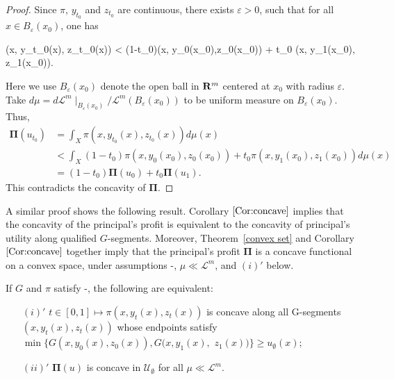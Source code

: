 \begin{proof}
	Since $\pi$, $y_{t_0}$ and $z_{t_0}$ are continuous, there exists $\varepsilon >0$, such that for all $x\in B_{\varepsilon}(x_0)$, one has
	\begin{flalign*}
	\pi(x, y_{t_0}(x), z_{t_0}(x)) < (1-t_0)\pi(x, y_0(x_0),z_0(x_0))  + t_0 \pi(x, y_1(x_0), z_1(x_0)).
	\end{flalign*} 
	Here we use $B_{\varepsilon}(x_0)$ denote the open ball in ${\mathbf R}^m$ centered at $x_0$ with radius $\varepsilon$.
	Take $d\mu = d\mathcal{L}^m
	\mid _{B_{\varepsilon} (x_0)}/{\mathcal{L}^m} 
	(B_{\varepsilon}(x_0))$ to be uniform measure on $B_\varepsilon(x_0)$. 
	Thus, 
	\begin{align*}
	\pmb \Pi (u_{t_0}) &= \int_X \pi(x, y_{t_0}(x), z_{t_0}(x)) d\mu(x)\\
	&<  \int_X    (1-t_0)\pi(x, y_0(x_0),z_0(x_0))  + t_0 \pi(x, y_1(x_0), z_1(x_0))     d\mu(x)\\
	&=(1-t_0)\pmb \Pi(u_0)+ t_0 \pmb \Pi(u_1).
	\end{align*}
	This contradicts the concavity of $\pmb \Pi$.
\end{proof}

A similar proof shows the following result. Corollary $\ref{Cor:concave}$ implies that the concavity of the principal's profit is equivalent to the concavity of principal's utility along qualified $G$-segments. Moreover, Theorem~\ref{convex set} and Corollary $\ref{Cor:concave}$ together imply that the principal's profit $\pmb \Pi$ is a concave functional on a convex space, under assumptions \Gzero-\Gfive, $\mu\ll \mathcal{L}^m$, and $(i)'$ below. 
\medskip

\begin{corollary}\label{Cor:concave}
	If $G$ and $\pi$ satisfy \Gzero-\Gfive,  the following are equivalent:
	\begin{enumerate}[(i)]
	\item[$(i)'$] $t\in[0,1] \longmapsto \pi(x, y_t(x) ,z_t(x))$ is concave  along all G-segments $(x, y_t(x), z_t(x))$ whose 
	endpoints satisfy $\min\{G(x, y_0(x), z_0(x)),G(x,y_1(x),$
	$z_1(x))\} \ge u_{\emptyset}(x)$;
	
	\item[$(ii)'$] $\pmb \Pi(u)$ is concave in $\mathcal{U}_{\emptyset}$  for all $\mu\ll \mathcal{L}^m$. 
	\end{enumerate}
\end{corollary}




